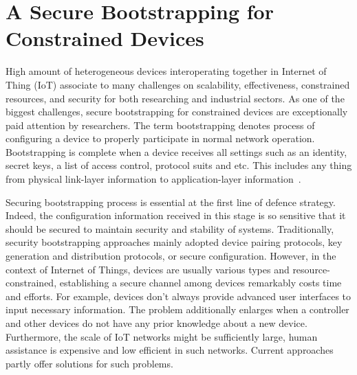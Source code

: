 \chapter{A Secure Bootstrapping for Constrained Devices} %

\label{Chapter5} %



High amount of heterogeneous devices interoperating together in Internet of Thing (IoT) associate to many challenges on scalability, effectiveness, constrained resources, and security for both researching and industrial sectors. As one of the biggest challenges, secure bootstrapping for constrained devices are exceptionally paid attention by researchers. The term bootstrapping denotes process of configuring a device to properly participate in normal network operation. Bootstrapping is complete when a device receives all settings such as an identity, secret keys, a list of access control, protocol suits and etc. This includes any thing from physical link-layer information to application-layer information~\cite{secureboot}. 

Securing bootstrapping process is essential at the first line of defence strategy. Indeed, the configuration information received in this stage is so sensitive that it should be secured to maintain security and stability of systems. Traditionally, security bootstrapping approaches mainly adopted device pairing protocols, key generation and distribution protocols, or secure configuration. However, in the context of Internet of Things, devices are usually various types and resource-constrained, establishing a secure channel among devices remarkably costs time and efforts. For example, devices don't always provide advanced user interfaces to input necessary information. The problem additionally enlarges when a controller and other devices do not have any prior knowledge about a new device. Furthermore, the scale of IoT networks might be sufficiently large, human assistance is expensive and low efficient in such networks. Current approaches partly offer solutions for such problems. 

